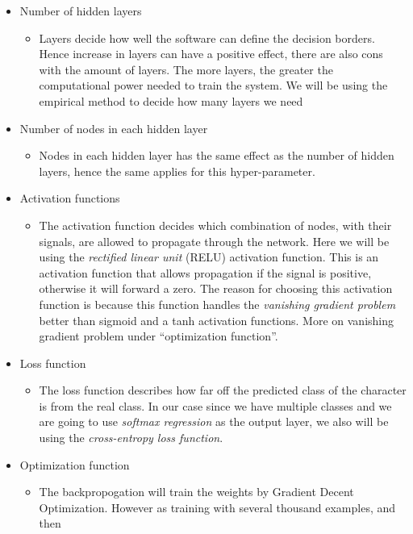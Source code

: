 \documentclass[11pt,a4paper,UKenglish]{article}
\begin{document}
\begin{itemize}
 \item{Number of hidden layers}
 \begin{itemize}
  \item{Layers decide how well the software can define the decision borders.
  Hence increase in layers can have a positive effect, there are also cons with
  the amount of layers. The more layers, the greater the computational power
  needed to train the system. We will be using the empirical method to decide
  how many layers we need}
 \end{itemize}
 \item{Number of nodes in each hidden layer}
 \begin{itemize}
  \item{Nodes in each hidden layer has the same effect as the number of hidden
  layers, hence the same applies for this hyper-parameter. }
 \end{itemize}
 \item{Activation functions}
 \begin{itemize}
  \item{The activation function decides which combination of nodes, with their
  signals, are allowed to propagate through the network. Here we will be using
  the \textit{rectified linear unit} (RELU) activation function. This is an
  activation function that allows propagation if the signal is positive,
  otherwise it will forward a zero. The reason for choosing this activation
  function is because this function handles the \textit{vanishing gradient
  problem} better than sigmoid and a tanh activation functions. More on
  vanishing gradient problem under ``optimization function''.}
 \end{itemize}
 \item{Loss function}
 \begin{itemize}
  \item{The loss function describes how far off the predicted class of the
  character is from the real class. In our case since we have multiple
  classes and we are going to use \textit{softmax regression} as the output
  layer, we also will be using the \textit{cross-entropy loss function}.}
 \end{itemize}
 \item{Optimization function}
 \begin{itemize}
  \item{The backpropogation will train the weights by Gradient Decent
  Optimization. However as training with several thousand examples, and then
}
\end{itemize}
\end{itemize}
\end{document}
